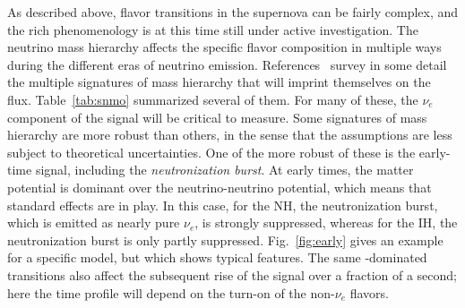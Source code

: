 As described above, flavor transitions
in the supernova can be fairly complex, and the rich phenomenology is
at this time still under active investigation.  The neutrino mass
hierarchy affects the specific flavor composition in multiple ways
during the different eras of neutrino emission.  
References~\cite{Mirizzi:2015eza,Scholberg:2017czd} survey in some detail the
multiple signatures of mass hierarchy that will imprint themselves on
the flux.  Table~\ref{tab:snmo} summarized several of them. For many of these, the $\nu_e$ component of the signal will
be critical to measure.    Some signatures of mass hierarchy are more robust than
others, in the sense that the assumptions are less subject to
theoretical uncertainties.  One of the more robust of these is the
early-time signal, including the \textit{neutronization burst}.   At
early times, the matter potential is dominant over the
neutrino-neutrino potential, which means that standard  effects are
in play.  In this case, for the NH, the neutronization burst, which is
emitted as nearly pure $\nu_e$, is strongly suppressed, whereas for
the IH, the neutronization burst is only partly suppressed.  
Fig.~\ref{fig:early} gives an example for a specific model, but which
shows typical features.  The same -dominated transitions also
affect
the subsequent rise of the signal over a fraction of a second; here
the time profile will depend on the turn-on of the non-$\nu_e$ flavors.

